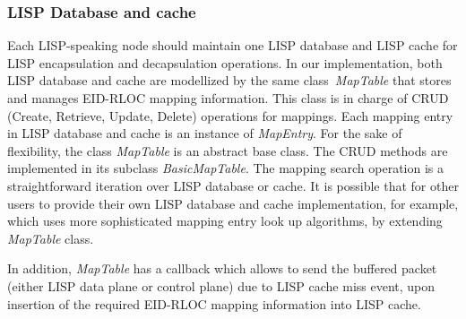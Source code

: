 \subsubsection{LISP Database and cache}
\label{subsec:database-impl}
Each LISP-speaking node should maintain one LISP database and LISP cache for LISP encapsulation and decapsulation operations. In our implementation, both LISP database and cache are modellized by the same class~\emph{MapTable} that stores and manages EID-RLOC mapping information. This class is in charge of CRUD (Create, Retrieve, Update, Delete) operations for mappings. Each mapping entry in LISP database and cache is an instance of \emph{MapEntry}. For the sake of flexibility, the class \emph{MapTable} is an abstract base class. The CRUD methods are implemented in its subclass \emph{BasicMapTable}. The mapping search operation is a straightforward iteration over LISP database or cache. It is possible that for other users to provide their own LISP database and cache implementation, for example, which uses more sophisticated mapping entry look up algorithms, by extending \emph{MapTable} class.

In addition, \emph{MapTable} has a callback which allows to send the buffered packet (either LISP data plane or control plane) due to LISP cache miss event, upon insertion of the required EID-RLOC mapping information into LISP cache.

